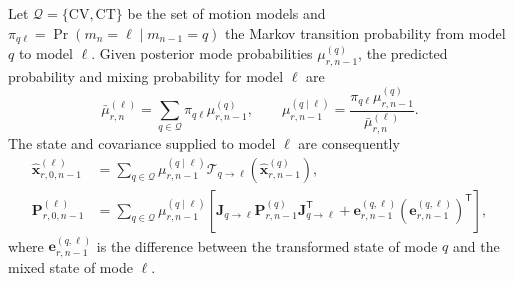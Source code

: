 Let \(\mathcal{Q}=\{\mathrm{CV},\mathrm{CT}\}\) be the set of motion models and
\(\pi_{q\ell}=\Pr(m_n=\ell\mid m_{n-1}=q)\) the Markov transition probability
from model \(q\) to model \(\ell\).  Given posterior mode probabilities
\(\mu^{(q)}_{r,n-1}\), the predicted probability and mixing probability for
model \(\ell\) are
\begin{equation}
    \bar{\mu}^{(\ell)}_{r,n}
    =
    \sum_{q\in\mathcal{Q}}\pi_{q\ell}\mu^{(q)}_{r,n-1},
    \qquad
    \mu^{(q\mid\ell)}_{r,n-1}
    =
    \frac{\pi_{q\ell}\mu^{(q)}_{r,n-1}}
    {\bar{\mu}^{(\ell)}_{r,n}}.
    \label{eq:method-imm-mixing-probability}
\end{equation}
The state and covariance supplied to model \(\ell\) are consequently
\begin{align}
    \widehat{\mathbf{x}}^{(\ell)}_{r,0,n-1}
    &=
    \sum_{q\in\mathcal{Q}}
    \mu^{(q\mid\ell)}_{r,n-1}
    \mathcal{T}_{q\rightarrow\ell}
    \left(\widehat{\mathbf{x}}^{(q)}_{r,n-1}\right),
    \label{eq:method-imm-mixed-state}\\
    \mathbf{P}^{(\ell)}_{r,0,n-1}
    &=
    \sum_{q\in\mathcal{Q}}
    \mu^{(q\mid\ell)}_{r,n-1}
    \left[
    \mathbf{J}_{q\rightarrow\ell}\mathbf{P}^{(q)}_{r,n-1}
    \mathbf{J}_{q\rightarrow\ell}^{\mathsf T}
    +\mathbf{e}^{(q,\ell)}_{r,n-1}
    \left(\mathbf{e}^{(q,\ell)}_{r,n-1}\right)^{\mathsf T}
    \right],
    \label{eq:method-imm-mixed-covariance}
\end{align}
where \(\mathbf{e}^{(q,\ell)}_{r,n-1}\) is the difference between the
transformed state of mode \(q\) and the mixed state of mode \(\ell\).

